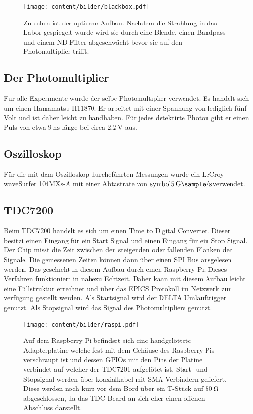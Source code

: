 \begin{figure}
  \centering
  \texttt{[image: content/bilder/blackbox.pdf]}
  \caption{Zu sehen ist der optische Aufbau. Nachdem die Strahlung in das Labor gespiegelt wurde wird sie durch
    eine Blende, einen Bandpass und einem ND-Filter abgeschwächt bevor sie auf den Photomultiplier trifft. }
  \label{fig:blackbox}
\end{figure}


\subsection{Der Photomultiplier}
\label{sec:Photomultiplier}
Für alle Experimente wurde der selbe Photomultiplier verwendet. Es handelt sich um einen Hamamatsu
H11870. Er arbeitet mit einer Spannung von lediglich fünf Volt und ist daher leicht zu handhaben.
Für jedes detektirte Photon gibt er einen Puls von etwa $\SI{9}{\nano\second}$ länge bei circa 
$\SI{2,2}{\volt}$ aus.



\subsection{Oszilloskop}
\label{sec:Oszilloskop}
Für die mit dem Oszilloskop durcheführten Messungen wurde ein LeCroy waveSurfer 104MXs-A mit einer 
Abtastrate von $\SI{5}[symbol]{\giga\sample\per\second}$verwendet. 

\subsection{TDC7200}
\label{sec:TDC}
Beim TDC7200 handelt es sich um einen Time to Digital Converter. Dieser besitzt einen Eingang für ein 
Start Signal und einen Eingang für ein Stop Signal. Der Chip misst die Zeit zwischen den steigenden oder 
fallenden Flanken der Signale. Die gemessenen Zeiten können dann über einen SPI Bus ausgelesen werden.
Das geschieht in diesem Aufbau durch einen Raspberry Pi. Dieses Verfahren funktioniert in nahezu Echtzeit. 
Daher kann mit diesem Aufbau leicht eine Füllstruktur errechnet und über das EPICS Protokoll im Netzwerk 
zur verfügung gestellt werden. Als Startsignal wird der DELTA Umlauftrigger genutzt. Als Stopsignal wird 
das Signal des Photomultipliers genutzt. 


\begin{figure}
  \centering
  \texttt{[image: content/bilder/raspi.pdf]}
  \caption{Auf dem Raspberry Pi befindset sich eine handgelöttete Adapterplatine welche fest mit dem Gehäuse
    des Raspberry Pis verschraupt ist und dessen GPIOs mit den Pins der Platine verbindet auf welcher der TDC7201
    aufgelötet ist. Start- und Stopsignal werden über koaxialkabel mit SMA Verbindern geliefert. Diese werden noch
    kurz vor dem Bord über ein T-Stück auf $\SI{50}{\ohm}$ abgeschlossen, da das TDC Board an sich eher einen offenen
    Abschluss darstellt.}
  \label{fig:raspi}
\end{figure}

